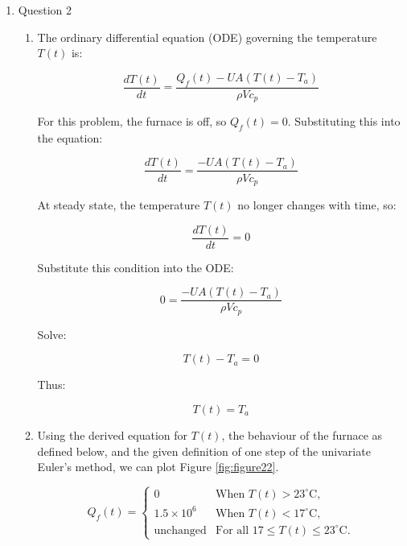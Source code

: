\documentclass[12pt]{article}
\begin{document}
\begin{enumerate}
\begin{enumerate}
  \end{enumerate}
\newpage

\item Question 2
  \begin{enumerate}
  \item 

  The ordinary differential equation (ODE) governing the temperature \( T(t) \) is:

  \[
  \frac{dT(t)}{dt} = \frac{Q_f(t) - UA(T(t) - T_a)}{\rho V c_p}
  \]

  For this problem, the furnace is off, so \( Q_f(t) = 0 \). Substituting this into the equation:

  \[
  \frac{dT(t)}{dt} = \frac{-UA(T(t) - T_a)}{\rho V c_p}
  \]

  At steady state, the temperature \( T(t) \) no longer changes with time, so:

  \[
  \frac{dT(t)}{dt} = 0
  \]

  Substitute this condition into the ODE:

  \[
  0 = \frac{-UA(T(t) - T_a)}{\rho V c_p}
  \]

  Solve:

  \[
  T(t) - T_a = 0
  \]

  Thus:

  \[
  T(t) = T_a
  \]

  \item
    Using the derived equation for \( T(t) \), the behaviour of the furnace as defined below, and the given definition of one step of the univariate Euler's method, we can plot Figure \ref{fig:figure22}.

  \[
  Q_f(t) =
  \begin{cases} 
  0 & \text{When } T(t) > 23^\circ \text{C}, \\
  1.5 \times 10^6 & \text{When } T(t) < 17^\circ \text{C}, \\
  \text{unchanged} & \text{For all } 17 \leq T(t) \leq 23^\circ \text{C}.
  \end{cases}
  \]


\end{enumerate}
\end{enumerate}
\end{document}
